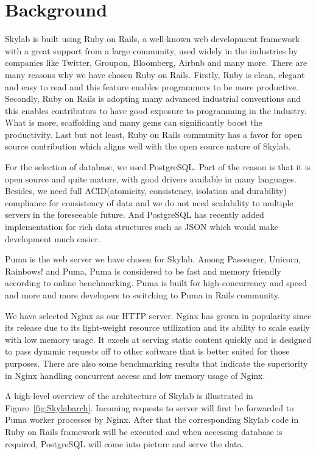 \chapter{Background} \label{background}

Skylab is built using Ruby on Rails, a well-known web development framework with a great support from a large community, used widely in the industries by companies like Twitter, Groupon, Bloomberg, Airbnb and many more\cite{citation1}. There are many reasons why we have chosen Ruby on Rails. Firstly, Ruby is clean, elegant and easy to read and this feature enables programmers to be more productive. Secondly, Ruby on Rails is adopting many advanced industrial conventions and this enables contributors to have good exposure to programming in the industry. What is more, scaffolding and many gems can significantly boost the productivity. Last but not least, Ruby on Rails community has a favor for open source contribution which aligns well with the open source nature of Skylab.

For the selection of database, we used PostgreSQL. Part of the reason is that it is open source and quite mature, with good drivers available in many languages\cite{citation2}. Besides, we need full ACID(atomicity, consistency, isolation and durability) compliance for consistency of data and we do not need scalability to multiple servers in the foreseeable future\cite{citationACID}. And PostgreSQL has recently added implementation for rich data structures such as JSON which would make development much easier\cite{citation3}.

Puma is the web server we have chosen for Skylab. Among Passenger, Unicorn, Rainbows! and Puma, Puma is considered to be fast and memory friendly according to online benchmarking\cite{citation4}. Puma is built for high-concurrency and speed and more and more developers to switching to Puma in Rails community\cite{citation5}.

We have selected Nginx as our HTTP server. Nginx has grown in popularity since its release due to its light-weight resource utilization and its ability to scale easily with low memory usage. It excels at serving static content quickly and is designed to pass dynamic requests off to other software that is better suited for those purposes\cite{citation6}. There are also some benchmarking results that indicate the superiority in Nginx handling concurrent access and low memory usage of Nginx\cite{citation7}.

A high-level overview of the architecture of Skylab is illustrated in Figure~\ref{fig:Skylabarch}. Incoming requests to server will first be forwarded to Puma worker processes by Nginx. After that the corresponding Skylab code in Ruby on Rails framework will be executed and when accessing database is required, PostgreSQL will come into picture and serve the data. 

